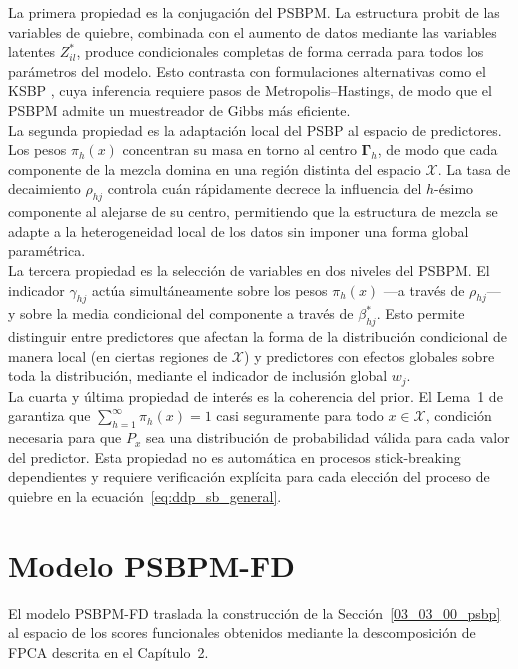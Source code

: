 La primera propiedad es la conjugación del PSBPM. La estructura probit de las variables de quiebre, combinada con el aumento de datos mediante las variables latentes $Z_{il}^*$, produce condicionales completas de forma cerrada para todos los parámetros del modelo. Esto contrasta con formulaciones alternativas como el KSBP \cite{02_06_dunson2008kernel}, cuya inferencia requiere pasos de Metropolis--Hastings, de modo que el PSBPM admite un muestreador de Gibbs más eficiente.\\

La segunda propiedad es la adaptación local del PSBP al espacio de predictores. Los pesos $\pi_h(x)$ concentran su masa en torno al centro $\boldsymbol{\Gamma}_h$, de modo que cada componente de la mezcla domina en una región distinta del espacio $\mathcal{X}$. La tasa de decaimiento $\rho_{hj}$ controla cuán rápidamente decrece la influencia del $h$-ésimo componente al alejarse de su centro, permitiendo que la estructura de mezcla se adapte a la heterogeneidad local de los datos sin imponer una forma global paramétrica.\\
 
La tercera propiedad es la selección de variables en dos niveles del PSBPM. El indicador $\gamma_{hj}$ actúa simultáneamente sobre los pesos $\pi_h(x)$ ---a través de $\rho_{hj}$--- y sobre la media condicional del componente a través de $\beta_{hj}^*$. Esto permite distinguir entre predictores que afectan la forma de la distribución condicional de manera local (en ciertas regiones de $\mathcal{X}$) y predictores con efectos globales sobre toda la distribución, mediante el indicador de inclusión global $w_j$.\\
 
La cuarta y última propiedad de interés es la coherencia del prior. El Lema~1 de \citet{03_02_chung2009nonparametric} garantiza que $\sum_{h=1}^{\infty}\pi_h(x) = 1$ casi seguramente para todo $x \in \mathcal{X}$, condición necesaria para que $P_x$ sea una distribución de probabilidad válida para cada valor del predictor. Esta propiedad no es automática en procesos stick-breaking dependientes y requiere verificación explícita para cada elección del proceso de quiebre en la ecuación~\eqref{eq:ddp_sb_general}.
 
\section{Modelo PSBPM-FD}
\label{03_04_00_modelo_propuesto_psbpm_fd}

El modelo PSBPM-FD traslada la construcción de la Sección~\ref{03_03_00_psbp} al espacio de los scores funcionales obtenidos mediante la descomposición de FPCA descrita en el Capítulo~2.\\

